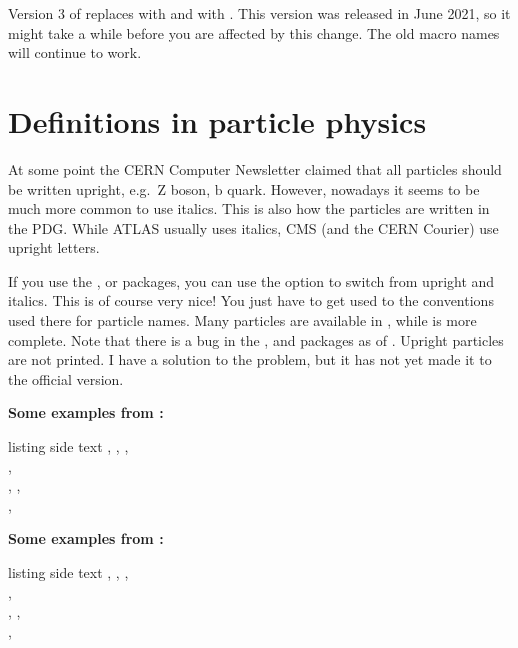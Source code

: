 Version 3 of  replaces  with 
and  with .
This version was released in June 2021,
so it might take a while before you are affected by this change.
The old macro names will continue to work.


\section{Definitions in particle physics}%
\label{sec:tips:hepparticles}

At some point the CERN Computer Newsletter claimed that all particles should be written
upright, e.g.\ \(\text{Z}\) boson, \(\text{b}\) quark.
However, nowadays it seems to be much more common to use italics.
This is also how the particles are written in the PDG\@.
While ATLAS usually uses italics, CMS (and the CERN Courier) use upright letters.

If you use the ,  or  packages,
you can use the option  to switch from upright and italics.
This is of course very nice!
You just have to get used to the conventions used there for particle names.
Many particles are available in ,
while  is more complete.
Note that there is a bug in the
,  and  packages
as of .
Upright particles are not printed.
I have a solution to the problem,
but it has not yet made it to the official version.

\noindent\textbf{Some examples from :}
\begin{tcblisting}{listing side text}
\Pe, \Pl, \Pqt, \Paqt\\
\PZ, \PWpm\\
\PBz, \PBpm, \PacB\\
\PBz{}\PBz, \PBz\PBz
\end{tcblisting}

\noindent\textbf{Some examples from :}
\begin{tcblisting}{listing side text}
\APelectron, \Plepton, \Ptop, \APtop\\
\PZ, \PWpm\\
\PBzero, \PBpm, \APBc\\
\PBzero{}\PBzero, \PBzero\PBzero
\end{tcblisting}

